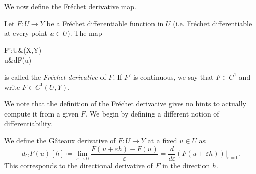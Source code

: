 We now define the Fréchet derivative map.
\begin{definition}
    Let $F:U\to Y$ be a Fréchet differentiable function in $U$ (i.e. Fréchet differentiable at every point $u\in U$). The map
    \begin{tightalign*}
        F':U&\to {}(X,Y)\\
        u&\mapsto dF(u)
    \end{tightalign*}
    is called the \emph{Fréchet derivative} of $F$. If $F'$ is continuous, we say that $F\in C^1$ and write $F\in C^1(U,Y)$.
\end{definition}

We note that the definition of the Fréchet derivative gives no hints to actually compute it from a given $F$. We begin by defining a different notion of differentiability.
\begin{definition}
    We define the Gâteaux derivative of $F:U\to Y$ at a fixed $u\in U$ as
    \begin{equation}\label{eq:gateaux-derivative}
        d_G F(u)[h] \coloneqq \lim_{\varepsilon\to 0} \frac{F(u+\varepsilon h)-F(u)}{\varepsilon} = \frac{d}{d\varepsilon}\left.\left(F(u+\varepsilon h)\right)\right|_{\varepsilon = 0}.
    \end{equation}
    This corresponds to the directional derivative of $F$ in the direction $h$.
\end{definition}


